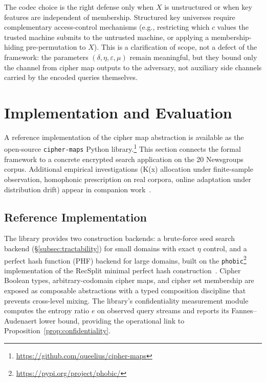 \documentclass[11pt]{article}
\theoremstyle{definition}
\theoremstyle{plain}
\theoremstyle{remark}
\begin{document}
The codec choice is the right defense only when $X$ is unstructured
or when key features are independent of membership.  Structured key
universes require complementary access-control mechanisms (e.g.,
restricting which $c$ values the trusted machine submits to the
untrusted machine, or applying a membership-hiding pre-permutation
to $X$).  This is a clarification of scope, not a defect of the
framework: the parameters $(\delta, \eta, \varepsilon, \mu)$ remain
meaningful, but they bound only the channel from cipher map outputs
to the adversary, not auxiliary side channels carried by the encoded
queries themselves.


\section{Implementation and Evaluation}
\label{sec:eval}

A reference implementation of the cipher map abstraction is available
as the open-source \texttt{cipher-maps} Python
library.\footnote{\url{https://github.com/queelius/cipher-maps}}  This
section connects the formal framework to a concrete encrypted search
application on the 20 Newsgroups corpus.  Additional empirical
investigations (K(x) allocation under finite-sample observation,
homophonic prescription on real corpora, online adaptation under
distribution drift) appear in companion
work~\cite{towell2026maxconf}.

\subsection{Reference Implementation}
\label{subsec:impl}

The library provides two construction backends: a brute-force seed
search backend (\S\ref{subsec:tractability}) for small domains with
exact $\eta$ control, and a perfect hash function (PHF) backend for
large domains, built on the
\texttt{phobic}\footnote{\url{https://pypi.org/project/phobic/}}
implementation of the RecSplit minimal perfect hash
construction~\cite{esposito2020recsplit}.  Cipher Boolean types,
arbitrary-codomain cipher maps, and cipher set membership are exposed
as composable abstractions with a typed composition discipline that
prevents cross-level mixing.  The library's confidentiality measurement
module computes the entropy ratio $e$ on observed query streams and
reports its Fannes--Audenaert lower bound, providing the operational
link to Proposition~\ref{prop:confidentiality}.
\end{document}

